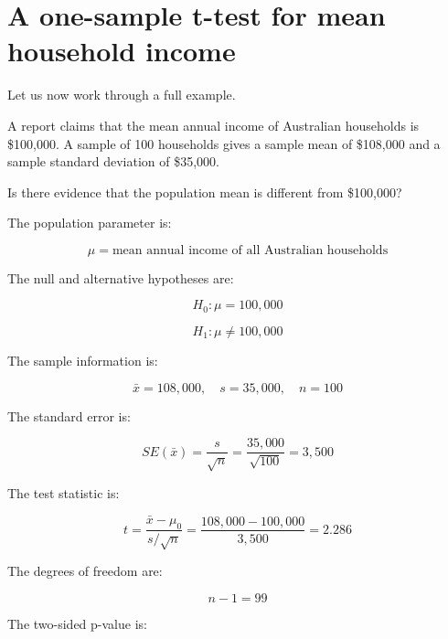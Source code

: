 \documentclass[
  letterpaper,
  DIV=11,
  numbers=noendperiod]{scrreprt}
\begin{document}
\section{A one-sample t-test for mean household
income}\label{a-one-sample-t-test-for-mean-household-income}

Let us now work through a full example.

\begin{tcolorbox}[enhanced jigsaw, arc=.35mm, bottomrule=.15mm, bottomtitle=1mm, breakable, colback=white, colbacktitle=quarto-callout-note-color!10!white, colframe=quarto-callout-note-color-frame, coltitle=black, left=2mm, leftrule=.75mm, opacityback=0, opacitybacktitle=0.6, rightrule=.15mm, title=\textcolor{quarto-callout-note-color}{\faInfo}\hspace{0.5em}{Mean household income}, titlerule=0mm, toprule=.15mm, toptitle=1mm]

A report claims that the mean annual income of Australian households is
\$100,000. A sample of 100 households gives a sample mean of \$108,000
and a sample standard deviation of \$35,000.

Is there evidence that the population mean is different from \$100,000?

\end{tcolorbox}

The population parameter is:

\[
\mu = \text{mean annual income of all Australian households}
\]

The null and alternative hypotheses are:

\[
H_0: \mu = 100{,}000
\]

\[
H_1: \mu \neq 100{,}000
\]

The sample information is:

\[
\bar{x} = 108{,}000,
\quad
s = 35{,}000,
\quad
n = 100
\]

The standard error is:

\[
SE(\bar{x})
=
\frac{s}{\sqrt{n}}
=
\frac{35{,}000}{\sqrt{100}}
=
3{,}500
\]

The test statistic is:

\[
t
=
\frac{\bar{x} - \mu_0}{s/\sqrt{n}}
=
\frac{108{,}000 - 100{,}000}{3{,}500}
=
2.286
\]

The degrees of freedom are:

\[
n - 1 = 99
\]

The two-sided p-value is:
\end{document}
